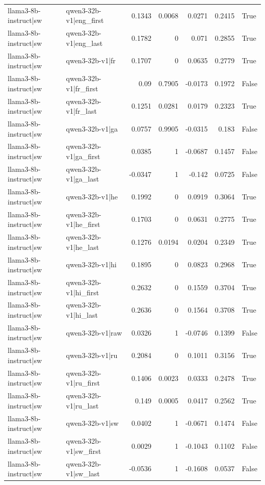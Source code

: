 \begin{table}
\begin{tabular}{l l r r r r l}
llama3-8b-instruct|sw & qwen3-32b-v1|eng_first & 0.1343 & 0.0068 & 0.0271 & 0.2415 & True \\
llama3-8b-instruct|sw & qwen3-32b-v1|eng_last & 0.1782 & 0 & 0.071 & 0.2855 & True \\
llama3-8b-instruct|sw & qwen3-32b-v1|fr & 0.1707 & 0 & 0.0635 & 0.2779 & True \\
llama3-8b-instruct|sw & qwen3-32b-v1|fr_first & 0.09 & 0.7905 & -0.0173 & 0.1972 & False \\
llama3-8b-instruct|sw & qwen3-32b-v1|fr_last & 0.1251 & 0.0281 & 0.0179 & 0.2323 & True \\
llama3-8b-instruct|sw & qwen3-32b-v1|ga & 0.0757 & 0.9905 & -0.0315 & 0.183 & False \\
llama3-8b-instruct|sw & qwen3-32b-v1|ga_first & 0.0385 & 1 & -0.0687 & 0.1457 & False \\
llama3-8b-instruct|sw & qwen3-32b-v1|ga_last & -0.0347 & 1 & -0.142 & 0.0725 & False \\
llama3-8b-instruct|sw & qwen3-32b-v1|he & 0.1992 & 0 & 0.0919 & 0.3064 & True \\
llama3-8b-instruct|sw & qwen3-32b-v1|he_first & 0.1703 & 0 & 0.0631 & 0.2775 & True \\
llama3-8b-instruct|sw & qwen3-32b-v1|he_last & 0.1276 & 0.0194 & 0.0204 & 0.2349 & True \\
llama3-8b-instruct|sw & qwen3-32b-v1|hi & 0.1895 & 0 & 0.0823 & 0.2968 & True \\
llama3-8b-instruct|sw & qwen3-32b-v1|hi_first & 0.2632 & 0 & 0.1559 & 0.3704 & True \\
llama3-8b-instruct|sw & qwen3-32b-v1|hi_last & 0.2636 & 0 & 0.1564 & 0.3708 & True \\
llama3-8b-instruct|sw & qwen3-32b-v1|raw & 0.0326 & 1 & -0.0746 & 0.1399 & False \\
llama3-8b-instruct|sw & qwen3-32b-v1|ru & 0.2084 & 0 & 0.1011 & 0.3156 & True \\
llama3-8b-instruct|sw & qwen3-32b-v1|ru_first & 0.1406 & 0.0023 & 0.0333 & 0.2478 & True \\
llama3-8b-instruct|sw & qwen3-32b-v1|ru_last & 0.149 & 0.0005 & 0.0417 & 0.2562 & True \\
llama3-8b-instruct|sw & qwen3-32b-v1|sw & 0.0402 & 1 & -0.0671 & 0.1474 & False \\
llama3-8b-instruct|sw & qwen3-32b-v1|sw_first & 0.0029 & 1 & -0.1043 & 0.1102 & False \\
llama3-8b-instruct|sw & qwen3-32b-v1|sw_last & -0.0536 & 1 & -0.1608 & 0.0537 & False \\

\end{tabular}
\end{table}
